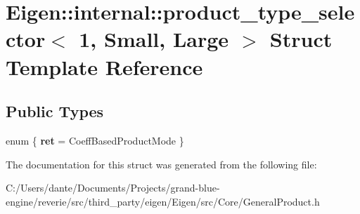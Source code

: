 \hypertarget{struct_eigen_1_1internal_1_1product__type__selector_3_011_00_01_small_00_01_large_01_4}{}\section{Eigen\+::internal\+::product\+\_\+type\+\_\+selector$<$ 1, Small, Large $>$ Struct Template Reference}
\label{struct_eigen_1_1internal_1_1product__type__selector_3_011_00_01_small_00_01_large_01_4}
\subsection*{Public Types}
\begin{DoxyCompactItemize}
\item 
\mbox{\label{struct_eigen_1_1internal_1_1product__type__selector_3_011_00_01_small_00_01_large_01_4_a050551fc45f9ad057786bcd9bbda9315}} 
enum \{ {\bfseries ret} = Coeff\+Based\+Product\+Mode
 \}
\end{DoxyCompactItemize}


The documentation for this struct was generated from the following file\+:\begin{DoxyCompactItemize}
\item 
C\+:/\+Users/dante/\+Documents/\+Projects/grand-\/blue-\/engine/reverie/src/third\+\_\+party/eigen/\+Eigen/src/\+Core/General\+Product.\+h\end{DoxyCompactItemize}
